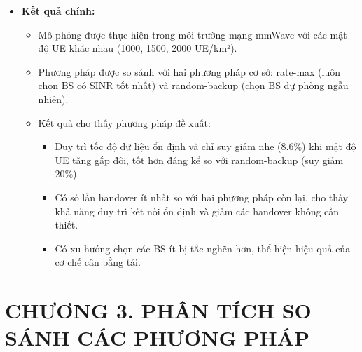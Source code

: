 \documentclass{article} %
\begin{document}
\begin{itemize}
\begin{itemize}
        \item Tại mỗi khoảng thời gian (CI), UE ước tính kênh với BS đang phục vụ và BS dự phòng được đề xuất bởi chính sách Q-learning.
        \item Handover sẽ được kích hoạt nếu SINR của BS đang phục vụ giảm xuống dưới một ngưỡng nhất định.
        \item Việc lựa chọn BS mới tuân theo ba tiêu chí ưu tiên:
        \begin{enumerate}
            \item Chọn BS có chất lượng tín hiệu tốt và còn tài nguyên.
            \item Nếu có nhiều ứng viên, chọn BS có thông tin kênh được cập nhật gần nhất (timer nhỏ nhất).
            \item Nếu vẫn có nhiều ứng viên, chọn BS có nhiều tài nguyên khả dụng nhất để cân bằng tải.
        \end{enumerate}
    \end{itemize}
    \item \textbf{Kết quả chính:}
    \begin{itemize}
        \item Mô phỏng được thực hiện trong môi trường mạng mmWave với các mật độ UE khác nhau (1000, 1500, 2000 UE/km²).
        \item Phương pháp được so sánh với hai phương pháp cơ sở: rate-max (luôn chọn BS có SINR tốt nhất) và random-backup (chọn BS dự phòng ngẫu nhiên).
        \item Kết quả cho thấy phương pháp đề xuất:
        \begin{itemize}
            \item Duy trì tốc độ dữ liệu ổn định và chỉ suy giảm nhẹ (8.6\%) khi mật độ UE tăng gấp đôi, tốt hơn đáng kể so với random-backup (suy giảm 20\%).
            \item Có số lần handover ít nhất so với hai phương pháp còn lại, cho thấy khả năng duy trì kết nối ổn định và giảm các handover không cần thiết.
            \item Có xu hướng chọn các BS ít bị tắc nghẽn hơn, thể hiện hiệu quả của cơ chế cân bằng tải.
        \end{itemize}
    \end{itemize}
\end{itemize}
\newpage
\section*{CHƯƠNG 3. PHÂN TÍCH SO SÁNH CÁC PHƯƠNG PHÁP}
\setcounter{section}{3}
\setcounter{subsection}{0}
\setcounter{figure}{0}
\setcounter{table}{0}
\end{document}

